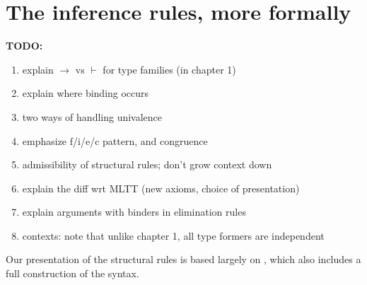 \egroup

\section{The inference rules, more formally}\label{syntax-more-formally}

\bgroup %

\renewcommand{\G}{\Gamma}
\newcommand{\ctx}{\ensuremath{\mathsf{ctx}}}
\newcommand{\emptyctx}{\cdot}
\newcommand{\wfctx}[1]{\vdash #1\ \ctx}
\newcommand{\oftp}[3]{#1 \vdash #2 : #3}
\newcommand{\jdeqtp}[4]{#1 \vdash #2 \jdeq #3 : #4}
\newcommand{\judg}[2]{#1 \vdash #2}
\newcommand{\tmtp}[2]{#1 \mathord{:} #2}
\newcommand{\form}{\textsc{form}}
\newcommand{\intro}{\textsc{intro}}
\newcommand{\elim}{\textsc{elim}}
\newcommand{\comp}{\textsc{comp}}
\newcommand{\Weak}{\mathsf{Wkg}}
\newcommand{\Vble}{\mathsf{Vble}}
\newcommand{\Exch}{\mathsf{Exch}}
\newcommand{\Subst}{\mathsf{Subst}}

\let\syn\mathsf

\textbf{TODO:} 
\begin{enumerate}
\item explain $\to$ vs $\vdash$ for type families (in chapter 1)
\item explain where binding occurs
\item two ways of handling univalence
\item emphasize f/i/e/c pattern, and congruence
\item admissibility of structural rules; don't grow context down
\item explain the diff wrt MLTT (new axioms, choice of presentation)
\item explain arguments with binders in elimination rules
\item contexts: note that unlike chapter 1, all type formers are independent
\end{enumerate}


Our presentation of the structural rules is based largely on
\cite{hofmann:syntax-and-semantics}, which also includes a full construction of
the syntax.  

